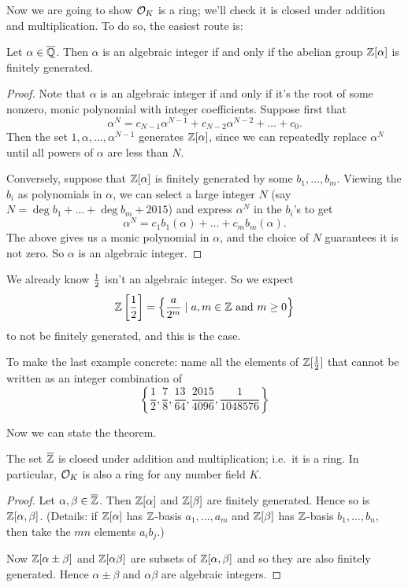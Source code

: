 Now we are going to show $\mathcal O_K$ is a ring;
we'll check it is closed under addition and multiplication.
To do so, the easiest route is:
\begin{lemma}
	\label{lem:alg_int_fg}
	Let $\alpha \in \overline{\mathbb Q}$.
	Then $\alpha$ is an algebraic integer if and only if
	the abelian group $\mathbb Z[\alpha]$ is finitely generated.
\end{lemma}
\begin{proof}
	Note that $\alpha$ is an algebraic integer if and only if it's the root
	of some nonzero, monic polynomial with integer coefficients.
	Suppose first that
	\[ \alpha^N = c_{N-1} \alpha^{N-1} + c_{N-2} \alpha^{N-2} + \dots + c_0. \]
	Then the set $1, \alpha, \dots, \alpha^{N-1}$ generates $\mathbb Z[\alpha]$,
	since we can repeatedly replace $\alpha^N$ until all powers of $\alpha$
	are less than $N$.

	Conversely, suppose that $\mathbb Z[\alpha]$ is finitely generated
	by some $b_1, \dots, b_m$.
	Viewing the $b_i$ as polynomials in $\alpha$, we can select a large integer
	$N$ (say $N = \deg b_1 + \dots + \deg b_m + 2015$)
	and express $\alpha^N$ in the $b_i$'s to get
	\[ \alpha^N = c_1b_1(\alpha) + \dots + c_mb_m(\alpha). \]
	The above gives us a monic polynomial in $\alpha$,
	and the choice of $N$ guarantees it is not zero.
	So $\alpha$ is an algebraic integer.
\end{proof}
\begin{example}
	We already know $\frac{1}{2}$ isn't an algebraic integer.
	So we expect
	\[ \mathbb Z \left[ \frac{1}{2} \right] = \left\{ \frac{a}{2^m}
		\mid a, m \in \mathbb Z \text{ and } m \ge 0 \right\} \]
	to not be finitely generated, and this is the case.
\end{example}
\begin{ques}
	To make the last example concrete:
	name all the elements of $\mathbb Z[\frac{1}{2}]$
	that cannot be written as an integer combination of
	\[ \left\{ \frac12, \frac{7}{8}, \frac{13}{64},
		\frac{2015}{4096}, \frac{1}{1048576} \right\} \]
\end{ques}

Now we can state the theorem.
\begin{theorem}
	The set $\overline{\mathbb Z}$ is closed under addition and multiplication;
	i.e.\ it is a ring.
	In particular, $\mathcal O_K$ is also a ring for any number field $K$.
\end{theorem}
\begin{proof}
	Let $\alpha, \beta \in \overline{\mathbb Z}$.
	Then $\mathbb Z[\alpha]$ and $\mathbb Z[\beta]$ are finitely generated.
	Hence so is $\mathbb Z[\alpha, \beta]$.
	(Details: if $\mathbb Z[\alpha]$ has $\mathbb Z$-basis $a_1, \dots, a_m$ and
	$\mathbb Z[\beta]$ has $\mathbb Z$-basis $b_1, \dots, b_n$,
	then take the $mn$ elements $a_ib_j$.)

	Now $\mathbb Z[\alpha \pm \beta]$ and $\mathbb Z[\alpha \beta]$ are subsets of $\mathbb Z[\alpha,\beta]$ and so they are also finitely generated.
	Hence $\alpha \pm \beta$ and $\alpha\beta$ are algebraic integers.
\end{proof}

